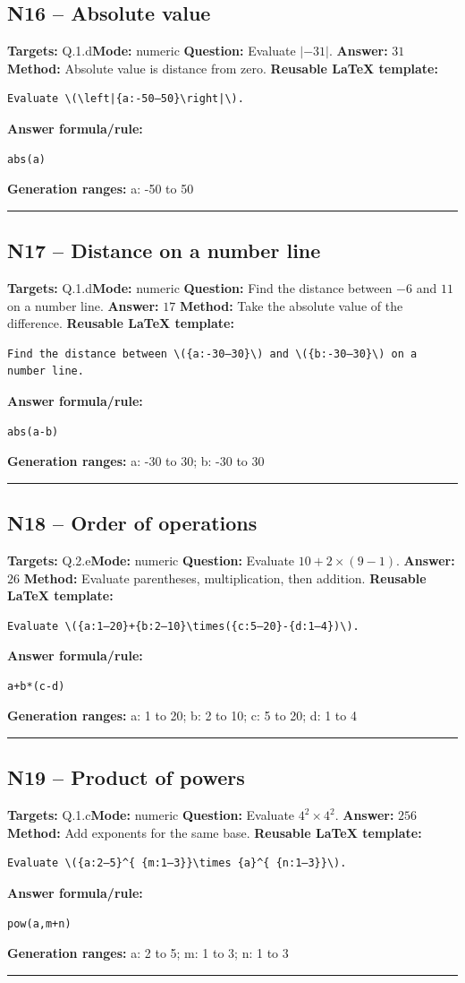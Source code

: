 \documentclass[11pt]{article}
\begin{document}
\subsection{N16 -- Absolute value}
\textbf{Targets:} Q.1.d\quad\textbf{Mode:} numeric
\textbf{Question:} Evaluate \(\left|-31\right|\).
\textbf{Answer:} \(31\)
\textbf{Method:} Absolute value is distance from zero.
\textbf{Reusable LaTeX template:}
\begin{verbatim}
Evaluate \(\left|{a:-50–50}\right|\).
\end{verbatim}
\textbf{Answer formula/rule:}
\begin{verbatim}
abs(a)
\end{verbatim}
\textbf{Generation ranges:} a: -50 to 50
\medskip\hrule\medskip
\subsection{N17 -- Distance on a number line}
\textbf{Targets:} Q.1.d\quad\textbf{Mode:} numeric
\textbf{Question:} Find the distance between \(-6\) and \(11\) on a number line.
\textbf{Answer:} \(17\)
\textbf{Method:} Take the absolute value of the difference.
\textbf{Reusable LaTeX template:}
\begin{verbatim}
Find the distance between \({a:-30–30}\) and \({b:-30–30}\) on a number line.
\end{verbatim}
\textbf{Answer formula/rule:}
\begin{verbatim}
abs(a-b)
\end{verbatim}
\textbf{Generation ranges:} a: -30 to 30; b: -30 to 30
\medskip\hrule\medskip
\subsection{N18 -- Order of operations}
\textbf{Targets:} Q.2.e\quad\textbf{Mode:} numeric
\textbf{Question:} Evaluate \(10+2\times(9-1)\).
\textbf{Answer:} \(26\)
\textbf{Method:} Evaluate parentheses, multiplication, then addition.
\textbf{Reusable LaTeX template:}
\begin{verbatim}
Evaluate \({a:1–20}+{b:2–10}\times({c:5–20}-{d:1–4})\).
\end{verbatim}
\textbf{Answer formula/rule:}
\begin{verbatim}
a+b*(c-d)
\end{verbatim}
\textbf{Generation ranges:} a: 1 to 20; b: 2 to 10; c: 5 to 20; d: 1 to 4
\medskip\hrule\medskip
\subsection{N19 -- Product of powers}
\textbf{Targets:} Q.1.c\quad\textbf{Mode:} numeric
\textbf{Question:} Evaluate \(4^{ 2}\times 4^{ 2}\).
\textbf{Answer:} \(256\)
\textbf{Method:} Add exponents for the same base.
\textbf{Reusable LaTeX template:}
\begin{verbatim}
Evaluate \({a:2–5}^{ {m:1–3}}\times {a}^{ {n:1–3}}\).
\end{verbatim}
\textbf{Answer formula/rule:}
\begin{verbatim}
pow(a,m+n)
\end{verbatim}
\textbf{Generation ranges:} a: 2 to 5; m: 1 to 3; n: 1 to 3
\medskip\hrule\medskip
\end{document}

